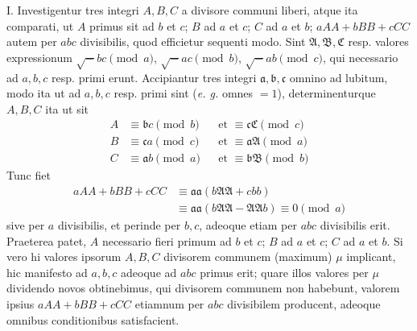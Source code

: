 I. Investigentur tres integri \(A,B,C\) a divisore communi liberi, atque ita comparati, ut \(A\) primus sit ad \(b\) et \(c\); \(B\) ad \(a\) et \(c\); \(C\) ad \(a\) et \(b\); \(aAA+bBB+cCC\) autem per \(abc\) divisibilis, quod efficietur sequenti modo. Sint \(\mathfrak A,\mathfrak B,\mathfrak C\) resp. valores expressionum \(\surd-bc\pmod a\), \(\surd-ac\pmod b\), \(\surd-ab\pmod c\), qui necessario ad \(a,b,c\) resp. primi erunt. Accipiantur tres integri \(\mathfrak a,\mathfrak b,\mathfrak c\) omnino ad lubitum, modo ita ut ad \(a,b,c\) resp. primi sint (\textit{e. g.} omnes \(=1\)), determinenturque \(A,B,C\) ita ut sit
\[
\begin{aligned}
A&\equiv\mathfrak b c\pmod b&&\text{et }\equiv\mathfrak c\mathfrak C\pmod c\\
B&\equiv\mathfrak c a\pmod c&&\text{et }\equiv\mathfrak a\mathfrak A\pmod a\\
C&\equiv\mathfrak a b\pmod a&&\text{et }\equiv\mathfrak b\mathfrak B\pmod b
\end{aligned}
\]
Tunc fiet
\[
\begin{aligned}
aAA+bBB+cCC&\equiv\mathfrak a\mathfrak a(b\mathfrak A\mathfrak A+cbb)\\
&\equiv\mathfrak a\mathfrak a(b\mathfrak A\mathfrak A-\mathfrak A\mathfrak A b)\equiv0\pmod a
\end{aligned}
\]
sive per \(a\) divisibilis, et perinde per \(b,c\), adeoque etiam per \(abc\) divisibilis erit. Praeterea patet, \(A\) necessario fieri primum ad \(b\) et \(c\); \(B\) ad \(a\) et \(c\); \(C\) ad \(a\) et \(b\). Si vero hi valores ipsorum \(A,B,C\) divisorem communem (maximum) \(\mu\) implicant, hic manifesto ad \(a,b,c\) adeoque ad \(abc\) primus erit; quare illos valores per \(\mu\) dividendo novos obtinebimus, qui divisorem communem non habebunt, valorem ipsius \(aAA+bBB+cCC\) etiamnum per \(abc\) divisibilem producent, adeoque omnibus conditionibus satisfacient.


